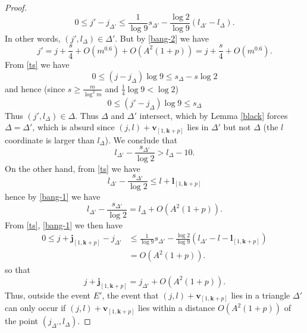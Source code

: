 \documentclass[12pt,a4paper,reqno]{amsart}
\numberwithin{equation}{section}
\theoremstyle{plain}
\theoremstyle{definition}
\renewcommand\j{\mathbf{j}}
\renewcommand\k{\mathbf{k}}
\renewcommand\v{\mathbf{v}}
\renewcommand\l{\mathbf{l}}
\begin{document}
\begin{proof}
$$0 \leq j'-j_{\Delta'} \leq \frac{1}{\log 9} s_{\Delta'} - \frac{\log 2}{\log 9} (l_{\Delta'}-l_\Delta).$$
In other words, $(j',l_\Delta) \in \Delta'$. But by \eqref{bang-2} we have
$$ j' = j + \frac{s}{4} + O(m^{0.6}) + O( A^2 (1+p) ) = j + \frac{s}{4} + O(m^{0.6}).$$
From \eqref{ts} we have
$$ 0 \leq (j-j_\Delta) \log 9 \leq s_\Delta - s \log 2$$
and hence (since $s \geq \frac{m}{\log^2 m}$ and $\frac{1}{4} \log 9 < \log 2$)
$$ 0 \leq (j'-j_\Delta) \log 9 \leq s_\Delta$$
Thus $(j',l_\Delta) \in \Delta$.  Thus $\Delta$ and $\Delta'$ intersect, which by Lemma \ref{black} forces $\Delta=\Delta'$, which is absurd since $(j,l) + \v_{[1,\k+p]}$ lies in $\Delta'$ but not $\Delta$ (the $l$ coordinate is larger than $l_\Delta$).  We conclude that
$$ l_{\Delta'} - \frac{s_{\Delta'}}{\log 2} > l_\Delta - 10.$$
On the other hand, from \eqref{ts} we have
$$ l_{\Delta'} - \frac{s_{\Delta'}}{\log 2} \leq l + \l_{[1,\k+p]}$$
hence by \eqref{bang-1} we have
\begin{equation}\label{joel}
 l_{\Delta'} - \frac{s_{\Delta'}}{\log 2} = l_\Delta + O( A^2 (1+p) ).
\end{equation}
From \eqref{ts}, \eqref{bang-1} we then have
\begin{align*}
 0 \leq j + \j_{[1,\k+p]} - j_{\Delta'} &\leq \frac{1}{\log 9} s_{\Delta'} - \frac{\log 2}{\log 9} (l_{\Delta'} - l - \l_{[1,\k+p]})  \\
&= O( A^2 (1+p) ).
\end{align*}
so that
$$ j + \j_{[1,\k+p]} = j_{\Delta'} + O( A^2 (1+p) ).$$
Thus, outside the event $E'$, the event that $(j,l) + \v_{[1,\k+p]}$ lies in a triangle $\Delta'$ can only occur if $(j,l) + \v_{[1,\k+p]}$ lies within a distance $O(A^2(1+p))$ of the point $(j_{\Delta'}, l_\Delta)$.


\end{proof}
\end{document}
